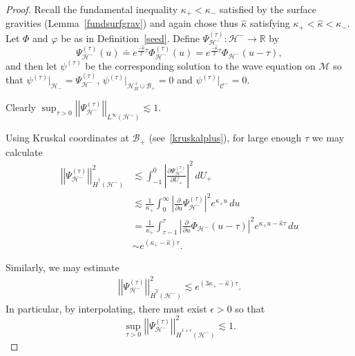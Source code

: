 \documentclass[A4,10pt]{article}
\begin{document}
\begin{proof}
Recall the fundamental inequality $\kappa_+<\kappa_-$ satisfied by the surface gravities
(Lemma~\ref{fundsurfgrav}) and again chose thus $\hat{\kappa}$ satisfying
$\kappa_+<\hat\kappa<\kappa_-$. 
Let $\Phi$ and $\varphi$ be as in Definition~\ref{seed}. Define $\Psi^{(\tau)}_{\mathcal{H}^-}:\mathcal{H}^- \to \mathbb{R}$ by
\[\Psi^{(\tau)}_{\mathcal{H}^-}\left(u\right) \doteq e^{\frac{-\hat{\kappa}}{2}\tau}\Phi^{(\tau)}_{\mathcal{H}^-}\left(u\right) = e^{\frac{-\hat{\kappa}}{2}\tau}\Phi_{\mathcal{H}^-}\left(u-\tau\right),\]
and then let $\psi^{(\tau)}$ be the corresponding solution to the wave equation on $\mathcal{M}$ so that $\psi^{(\tau)}|_{\mathcal{H}_-} = \Psi^{(\tau)}_{\mathcal{H}^-}$,
 $\psi^{(\tau)}|_{\mathcal{H}^+_B\cup\mathcal{B}_+} = 0$ and $\psi^{(\tau)}|_{\mathcal{C}^-} = 0$. 

Clearly $\sup_{\tau > 0}\left\vert\left\vert \Psi^{(\tau)}_{\mathcal{H}^-}\right\vert\right\vert_{L^{\infty}\left(\mathcal{H}^-\right)} \lesssim 1$. 

Using Kruskal coordinates at $\mathcal{B}_+$ (see~\eqref{kruskalplus}), for large enough $\tau$ we may calculate
\begin{align}\label{h1psi}
\left\vert\left\vert \Psi^{(\tau)}_{\mathcal{H}^-}\right\vert\right\vert^2_{\dot{H}^1\left(\mathcal{H}^-\right)} &\lesssim  \int_{-1}^0\left|\frac{\partial \Psi^{(\tau)}_{\mathcal{H}^-}}{\partial U_+}\right|^2\, dU_+ 
\\ \nonumber &\lesssim \frac{1}{\kappa_+}\int_0^{\infty}\left|\frac{\partial}{\partial u}\Psi^{(\tau)}_{\mathcal{H}^-}\right|^2e^{\kappa_+ u}\, du
\\ \nonumber &= \frac{1}{\kappa_+}\int_{\tau-1}^{\tau}\left|\frac{\partial}{\partial u}\Phi_{\mathcal{H}^-}\left(u-\tau\right)\right|^2 e^{\kappa_+u - \hat{\kappa}\tau}\, du
\\ \nonumber &\sim e^{\left(\kappa_+-\hat{\kappa}\right)\tau}.
\end{align}

Similarly, we may estimate
\begin{align}\label{h2psi}
\left\vert\left\vert \Psi^{(\tau)}_{\mathcal{H}^-}\right\vert\right\vert^2_{\dot{H}^2\left(\mathcal{H}^-\right)} \lesssim e^{\left(3\kappa_+-\hat{\kappa}\right)\tau}. 
\end{align}
In particular, by interpolating, there must exist $\epsilon > 0$ so that
\begin{equation}\label{basich1epest1}
\sup_{\tau > 0}\left\vert\left\vert \Psi^{(\tau)}_{\mathcal{H}^-}\right\vert\right\vert^2_{\dot{H}^{1+\epsilon}\left(\mathcal{H}^-\right)} \lesssim 1.
\end{equation}




\end{proof}
\end{document}
